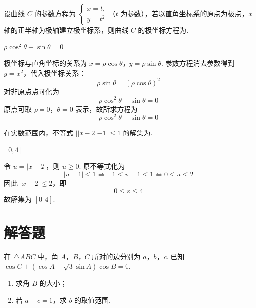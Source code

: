 \begin{problem}
设曲线 \(C\) 的参数方程为 \(\begin{cases}
x = t,\\
y = t^2
\end{cases}\)（\(t\) 为参数），若以直角坐标系的原点为极点，\(x\) 轴的正半轴为极轴建立极坐标系，则曲线 \(C\) 的极坐标方程为\fillinblank{}.
\end{problem}

\begin{answer}
\(\rho\cos^2\theta - \sin\theta = 0\)
\end{answer}

\begin{solution}
极坐标与直角坐标的关系为
\(x=\rho\cos\theta\)，\(y=\rho\sin\theta\).
参数方程消去参数得到 \(y=x^2\)，代入极坐标关系：
\[
\rho\sin\theta=(\rho\cos\theta)^2
\]
对非原点点可化为
\[
\rho\cos^2\theta-\sin\theta=0
\]
原点可取 \(\rho=0\)，\(\theta=0\) 表示，故所求方程为
\[
\rho\cos^2\theta-\sin\theta=0
\]
\end{solution}

\begin{problem}
在实数范围内，不等式 \(||x - 2| - 1| \leqslant 1\) 的解集为\fillinblank{}.
\end{problem}

\begin{answer}
\([0,4]\)
\end{answer}

\begin{solution}
令 \(u=|x-2|\)，则 \(u\geqslant0\). 原不等式化为
\[
|u-1|\leqslant1
\Longleftrightarrow
-1\leqslant u-1\leqslant1
\Longleftrightarrow
0\leqslant u\leqslant2
\]
因此 \(|x-2|\leqslant2\)，即
\[
0\leqslant x\leqslant4
\]
故解集为 \([0,4]\).
\end{solution}

\section{解答题}

\begin{problem}
在 \(\triangle ABC\) 中，角 \(A\)，\(B\)，\(C\) 所对的边分别为 \(a\)，\(b\)，\(c\). 已知 \(\cos C + (\cos A - \sqrt{3}\sin A)\cos B = 0\).

\begin{enumerate}
\item 求角 \(B\) 的大小；
\item 若 \(a + c = 1\)，求 \(b\) 的取值范围.
\end{enumerate}
\end{problem}

